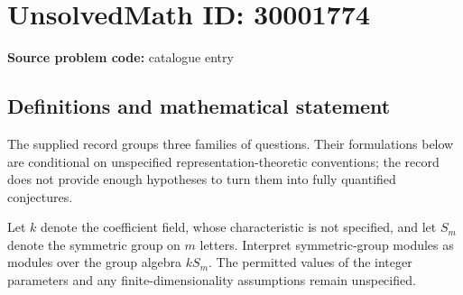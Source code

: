 \documentclass[11pt]{article}
\begin{document}
\section*{UnsolvedMath ID: 30001774}
\textbf{Source problem code:} catalogue entry
\subsection{Definitions and mathematical statement}
The supplied record groups three families of questions. Their formulations below are conditional on unspecified representation-theoretic conventions; the record does not provide enough hypotheses to turn them into fully quantified conjectures.

Let \(k\) denote the coefficient field, whose characteristic is not specified, and let \(S_m\) denote the symmetric group on \(m\) letters. Interpret symmetric-group modules as modules over the group algebra \(kS_m\). The permitted values of the integer parameters and any finite-dimensionality assumptions remain unspecified.
\end{document}
